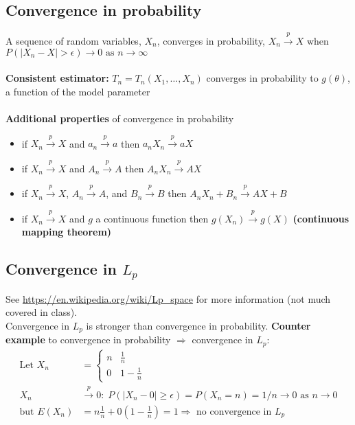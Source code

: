 \documentclass{article}
\newcommand{\abs}[1]{\lvert#1\rvert}
\begin{document}
\subsection{Convergence in probability}
A sequence of random variables, $X_n$, converges in probability, $X_n \overset{p}{\longrightarrow} X$ when
$P(\abs{X_n - X} > \epsilon) \longrightarrow 0 \textrm{ as } n \longrightarrow \infty$\\\\
\textbf{Consistent estimator:} $T_n = T_n(X_1, \dots, X_n)$ converges in probability to $g(\theta)$, a function of the model parameter\\\\
\textbf{Additional properties} of convergence in probability
\begin{itemize}
    \item if $X_n \overset{p}{\longrightarrow} X$ and $a_n \overset{p}{\longrightarrow} a$ then $a_nX_n \overset{p}{\longrightarrow} aX$
    \item if $X_n \overset{p}{\longrightarrow} X$ and $A_n \overset{p}{\longrightarrow} A$ then $A_nX_n \overset{p}{\longrightarrow} AX$
    \item if $X_n \overset{p}{\longrightarrow} X$, $A_n \overset{p}{\longrightarrow} A$, and $B_n \overset{p}{\longrightarrow} B$ then $A_nX_n + B_n \overset{p}{\longrightarrow} AX + B$
    \item if $X_n \overset{p}{\longrightarrow} X$ and $g$ a continuous function then $g(X_n) \overset{p}{\longrightarrow} g(X)$ \textbf{(continuous mapping theorem)}
\end{itemize}

\subsection{Convergence in $L_p$}
See \url{https://en.wikipedia.org/wiki/Lp_space} for more information (not much covered in class).\\
Convergence in $L_p$ is stronger than convergence in probability. 
\textbf{Counter example} to convergence in probability $\Longrightarrow$ convergence in $L_p$:
\begin{align*}
    \textrm{Let } X_n &= \begin{cases}
        n & \frac{1}{n}\\
        0 & 1 - \frac{1}{n}
    \end{cases}\\
    X_n &\overset{p}{\longrightarrow} 0: \; P(\abs{X_n - 0} \geq \epsilon) = P(X_n = n) = 1/n \longrightarrow 0 \textrm{ as } n \longrightarrow 0\\
    \textrm{but } E(X_n) &= n\frac{1}{n} + 0(1 - \frac{1}{n}) = 1 \Longrightarrow \textrm{ no convergence in } L_p
\end{align*}
\end{document}
